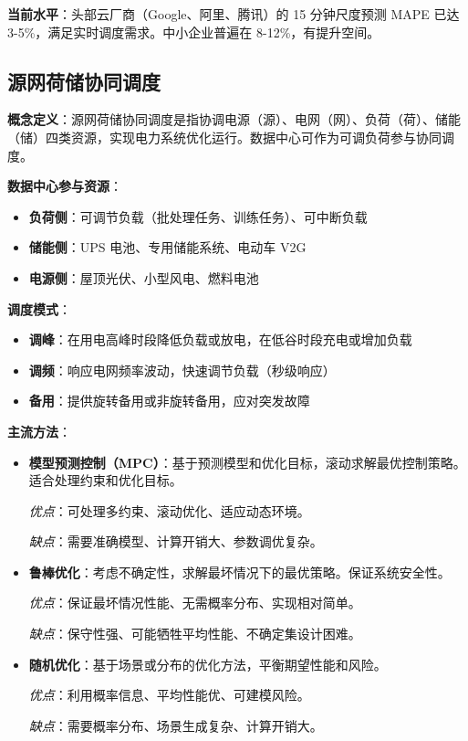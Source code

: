 \documentclass[12pt,a4paper]{article}
\begin{document}
\textbf{当前水平}：头部云厂商（Google、阿里、腾讯）的 15 分钟尺度预测 MAPE 已达 3-5\%，满足实时调度需求。中小企业普遍在 8-12\%，有提升空间。

\subsection{源网荷储协同调度}

\textbf{概念定义}：源网荷储协同调度是指协调电源（源）、电网（网）、负荷（荷）、储能（储）四类资源，实现电力系统优化运行。数据中心可作为可调负荷参与协同调度\cite{iea2023data}。

\textbf{数据中心参与资源}：
\begin{itemize}
    \item \textbf{负荷侧}：可调节负载（批处理任务、训练任务）、可中断负载
    \item \textbf{储能侧}：UPS 电池、专用储能系统、电动车 V2G
    \item \textbf{电源侧}：屋顶光伏、小型风电、燃料电池
\end{itemize}

\textbf{调度模式}：
\begin{itemize}
    \item \textbf{调峰}：在用电高峰时段降低负载或放电，在低谷时段充电或增加负载
    \item \textbf{调频}：响应电网频率波动，快速调节负载（秒级响应）
    \item \textbf{备用}：提供旋转备用或非旋转备用，应对突发故障
\end{itemize}

\textbf{主流方法}：

\begin{itemize}
    \item \textbf{模型预测控制（MPC）}：基于预测模型和优化目标，滚动求解最优控制策略。适合处理约束和优化目标。
    
    \textit{优点}：可处理多约束、滚动优化、适应动态环境。
    
    \textit{缺点}：需要准确模型、计算开销大、参数调优复杂。
    
    \item \textbf{鲁棒优化}：考虑不确定性，求解最坏情况下的最优策略。保证系统安全性。
    
    \textit{优点}：保证最坏情况性能、无需概率分布、实现相对简单。
    
    \textit{缺点}：保守性强、可能牺牲平均性能、不确定集设计困难。
    
    \item \textbf{随机优化}：基于场景或分布的优化方法，平衡期望性能和风险。
    
    \textit{优点}：利用概率信息、平均性能优、可建模风险。
    
    \textit{缺点}：需要概率分布、场景生成复杂、计算开销大。
\end{itemize}
\end{document}
